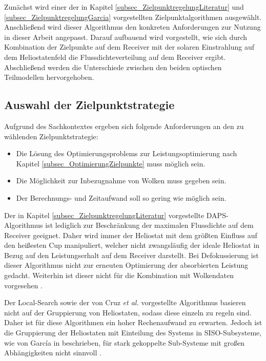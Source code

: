 Zunächst wird einer der in Kapitel \ref{subsec_ZielpunktregelungLiteratur} und \ref{subsec_ZielpunktregelungGarcia} vorgestellten Zielpunktalgorithmen ausgewählt.
Anschließend wird dieser Algorithmus den konkreten Anforderungen zur Nutzung in dieser Arbeit angepasst.
Darauf aufbauend wird vorgestellt, wie sich durch Kombination der Zielpunkte auf dem Receiver mit der solaren Einstrahlung auf dem Heliostatenfeld die Flussdichteverteilung auf dem Receiver ergibt.
Abschließend werden die Unterschiede zwischen den beiden optischen Teilmodellen hervorgehoben.


\subsection{Auswahl der Zielpunktstrategie} \label{subsec_AuswahlAlgorithmus}
Aufgrund des Sachkontextes ergeben sich folgende Anforderungen an den zu wählenden Zielpunktstrategie:
\begin{itemize}
    \item Die Lösung des Optimierungsproblems zur Leistungsoptimierung nach Kapitel \ref{subsec_OptimierungZielpunkte} muss möglich sein.
    \item Die Möglichkeit zur Inbezugnahme von Wolken muss gegeben sein.
    \item Der Berechnungs- und Zeitaufwand soll so gering wie möglich sein.
\end{itemize}

Der in Kapitel \ref{subsec_ZielpunktregelungLiteratur} vorgestellte DAPS-Algorithmus \cite{VantHull2}\cite{VantHull3} ist lediglich zur Beschränkung der maximalen Flussdichte auf dem Receiver geeignet.
Daher wird immer der Heliostat mit dem größten Einfluss auf den heißesten Cup manipuliert, welcher nicht zwangsläufig der ideale Heliostat in Bezug auf den Leistungserhalt auf dem Receiver darstellt.
Bei Defokussierung ist dieser Algorithmus nicht zur erneuten Optimierung der absorbierten Leistung gedacht.
Weiterhin ist dieser nicht für die Kombination mit Wolkendaten vorgesehen \cite[S.35]{DissOberkirsch}.

Der Local-Search \cite{Maldonado}\cite{Maldonado2} sowie der von Cruz \textit{et al.} \cite{Cruz} vorgestellte Algorithmus basieren nicht auf der Gruppierung von Heliostaten, sodass diese einzeln zu regeln sind.
Daher ist für diese Algorithmen ein hoher Rechenaufwand zu erwarten.
Jedoch ist die Gruppierung der Heliostaten mit Einteilung des Systems in SISO-Subsysteme, wie von García in \cite{Garcia1} beschrieben, für stark gekoppelte Sub-Systeme mit großen Abhängigkeiten nicht sinnvoll \cite[S.33]{DissZanger}.

